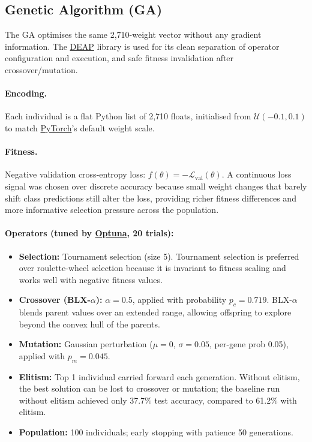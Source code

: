 \documentclass[11pt,a4paper]{article}
\begin{document}
\subsection{Genetic Algorithm (GA)}

The GA optimises the same 2,710-weight vector without any gradient information. The
\href{https://deap.readthedocs.io}{DEAP} library is used for its clean separation of operator
configuration and execution, and safe fitness invalidation after crossover/mutation.

\paragraph{Encoding.} Each individual is a flat Python list of 2,710 floats, initialised from
$\mathcal{U}(-0.1, 0.1)$ to match \href{https://pytorch.org}{PyTorch}'s default weight scale.

\paragraph{Fitness.} Negative validation cross-entropy loss:
$f(\theta) = -\mathcal{L}_\mathrm{val}(\theta)$. A continuous loss signal was chosen over discrete
accuracy because small weight changes that barely shift class predictions still alter the loss,
providing richer fitness differences and more informative selection pressure across the population.

\paragraph{Operators (tuned by \href{https://optuna.org}{Optuna}, 20 trials):}
\begin{itemize}
    \item \textbf{Selection:} Tournament selection (size 5). Tournament selection is preferred over
          roulette-wheel selection because it is invariant to fitness scaling and works well with
          negative fitness values.
    \item \textbf{Crossover (BLX-$\alpha$):} $\alpha = 0.5$, applied with probability $p_c = 0.719$.
          BLX-$\alpha$ blends parent values over an extended range, allowing offspring to explore
          beyond the convex hull of the parents.
    \item \textbf{Mutation:} Gaussian perturbation ($\mu=0$, $\sigma=0.05$, per-gene
          prob 0.05), applied with $p_m = 0.045$.
    \item \textbf{Elitism:} Top 1 individual carried forward each generation. Without elitism, the
          best solution can be lost to crossover or mutation; the baseline run without elitism
          achieved only 37.7\% test accuracy, compared to 61.2\% with elitism.
    \item \textbf{Population:} 100 individuals; early stopping with patience 50 generations.
\end{itemize}
\end{document}
